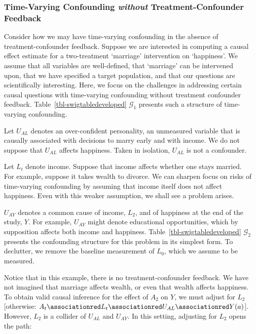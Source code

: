 \documentclass[
  single column]{article}
\begin{document}
\subsubsection{\texorpdfstring{Time-Varying Confounding \emph{without}
Treatment-Confounder
Feedback}{Time-Varying Confounding without Treatment-Confounder Feedback}}\label{time-varying-confounding-without-treatment-confounder-feedback}

Consider how we may have time-varying confounding in the absence of
treatment-confounder feedback. Suppose we are interested in computing a
causal effect estimate for a two-treatment `marriage' intervention on
`happiness'. We assume that all variables are well-defined, that
`marriage' can be intervened upon, that we have specified a target
population, and that our questions are scientifically interesting. Here,
we focus on the challenges in addressing certain causal questions with
time-varying confounding without treatment confounder feedback.
Table~\ref{tbl-swigtabledeveloped} \(\mathcal{G}_1\) presents such a
structure of time-varying confounding.

Let \(U_{AL}\) denotes an over-confident personality, an unmeasured
variable that is causally associated with decisions to marry early and
with income. We do not suppose that \(U_{AL}\) affects happiness. Taken
in isolation, \(U_{AL}\) is not a confounder.

Let \(L_t\) denote income. Suppose that income affects whether one stays
married. For example, suppose it takes wealth to divorce. We can sharpen
focus on risks of time-varying confounding by assuming that income
itself does not affect happiness. Even with this weaker assumption, we
shall see a problem arises.

\(U_{AY}\) denotes a common cause of income, \(L_2\), and of happiness
at the end of the study, \(Y\). For example, \(U_{AY}\) might denote
educational opportunities, which by supposition affects both income and
happiness. Table~\ref{tbl-swigtabledeveloped} \(\mathcal{G}_2\) presents
the confounding structure for this problem in its simplest form. To
declutter, we remove the baseline measurement of \(L_0\), which we
assume to be measured.

Notice that in this example, there is no treatment-confounder feedback.
We have not imagined that marriage affects wealth, or even that wealth
affects happiness. To obtain valid causal inference for the effect of
\(A_2\) on \(Y\), we must adjust for \(L_2\) {[}otherwise:
\(A_t\associationred L_t \associationred U_{AL}\associationred Y(a)\){]}.
However, \(L_2\) is a collider of \(U_{AL}\) and \(U_{AY}\). In this
setting, adjusting for \(L_2\) opens the path:
\end{document}
